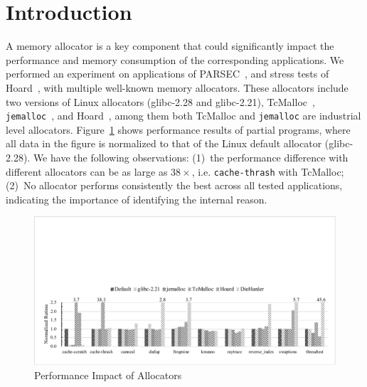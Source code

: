

\section{Introduction}

A memory allocator is a key component that could significantly impact the performance and memory consumption of the corresponding applications. We performed an experiment on applications of PARSEC~\cite{parsec}, and stress tests of Hoard~\cite{Hoard}, with multiple well-known memory allocators. These allocators include two versions of Linux allocators (glibc-2.28 and glibc-2.21), TcMalloc~\cite{tcmalloc}, \texttt{jemalloc}~\cite{jemalloc}, and Hoard~\cite{Hoard}, among them both TcMalloc and \texttt{jemalloc} are industrial level allocators. Figure~\ref{fig:motivation} shows performance results of partial programs, where all data in the figure is normalized to that of the Linux default allocator (glibc-2.28). We have the following observations: (1)~the performance difference with different allocators can be as large as $38\times$, i.e. \texttt{cache-thrash} with TcMalloc; (2)~No allocator performs consistently the best across all tested applications, indicating the importance of identifying the internal reason.

\begin{figure}[!ht]
\centering
\includegraphics[width=0.98\columnwidth]{figures/perfdiff}
\caption{Performance Impact of Allocators\label{fig:motivation}}
\end{figure}

